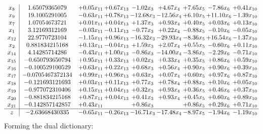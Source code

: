 \documentclass[8pt]{article}
\begin{document}
\[\begin{array}{c| c c@{\hskip 2pt} c@{\hskip 2pt} c@{\hskip 2pt} c@{\hskip 2pt} c@{\hskip 2pt} c@{\hskip 2pt} c@{\hskip 2pt} }
 x_{8}   &  1.65079365079 & +  0.05 x_{11} & +  0.67 x_{13} & -1.02 x_{3} & +  4.67 x_{4} & +  7.65 x_{5} & -7.86 x_{6} & +  0.41 x_{10}\\
 x_{9}   &  19.1005291005 & -0.63 x_{11} & +  0.78 x_{13} & -12.68 x_{3} & -12.56 x_{4} & +  6.10 x_{5} & + 11.10 x_{6} & -1.39 x_{10}\\
 x_{7}   &  1.07054673721 & +  0.01 x_{11} & +  0.04 x_{13} & +  1.37 x_{3} & +  0.93 x_{4} & +  0.40 x_{5} & +  0.03 x_{6} & +  0.13 x_{10}\\
 x_{1}   &  3.12169312169 & -0.03 x_{11} & -0.11 x_{13} & -0.77 x_{3} & +  0.22 x_{4} & -0.88 x_{5} & -0.10 x_{6} & -0.05 x_{10}\\
 x_{12}   &  22.9770723104 & -1.15 x_{11} & +  0.96 x_{13} & -16.32 x_{3} & -29.93 x_{4} & -8.36 x_{5} & + 16.54 x_{6} & -1.37 x_{10}\\
 x_{2}   &  0.881834215168 & +  0.13 x_{11} & -0.04 x_{13} & +  1.59 x_{3} & +  2.07 x_{4} & +  0.55 x_{5} & -0.60 x_{6} & +  0.11 x_{10}\\
 x_{14}   &  4.14285714286 & -0.43 x_{11} & +  1.00 x_{13} & -0.86 x_{3} & -14.00 x_{4} & -3.86 x_{5} & -2.29 x_{6} & -0.71 x_{10}\\
 x_{15}   &  -0.650793650794 & +  0.95 x_{11} & +  0.33 x_{13} & +  0.02 x_{3} & +  0.33 x_{4} & +  0.35 x_{5} & +  0.86 x_{6} & +  0.59 x_{10}\\
 x_{16}   &  -0.100529100529 & +  0.63 x_{11} & +  0.22 x_{13} & +  0.68 x_{3} & +  0.56 x_{4} & +  0.90 x_{5} & +  0.90 x_{6} & +  0.39 x_{10}\\
 x_{17}   &  -0.0705467372134 & +  0.99 x_{11} & +  0.96 x_{13} & +  0.63 x_{3} & +  0.07 x_{4} & +  0.60 x_{5} & +  0.97 x_{6} & +  0.87 x_{10}\\
 x_{18}   &  -0.121693121693 & +  0.03 x_{11} & +  0.11 x_{13} & +  0.77 x_{3} & +  0.78 x_{4} & +  0.88 x_{5} & +  0.10 x_{6} & +  0.05 x_{10}\\
 x_{19}   &  -0.977072310406 & +  0.15 x_{11} & +  0.04 x_{13} & +  0.32 x_{3} & +  0.93 x_{4} & +  0.36 x_{5} & +  0.46 x_{6} & +  0.37 x_{10}\\
 x_{20}   &  -0.881834215168 & +  0.87 x_{11} & +  0.04 x_{13} & +  0.41 x_{3} & +  0.93 x_{4} & +  0.45 x_{5} & +  0.60 x_{6} & +  0.89 x_{10}\\
 x_{21}   &  -0.142857142857 & +  0.43 x_{11} &   & +  0.86 x_{3} &   & +  0.86 x_{5} & +  0.29 x_{6} & +  0.71 x_{10}\\
\hline
z    &  -2.63668430335 & -0.65 x_{11} & -0.26 x_{13} & -16.71 x_{3} & -17.48 x_{4} & -8.97 x_{5} & -1.94 x_{6} & -1.19 x_{10}\\
\end{array}\]
Forming the dual dictionary:
\end{document}
